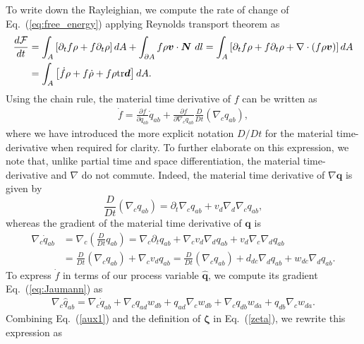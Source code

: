 \documentclass[12pt]{iopart}
\begin{document}
	To write down the Rayleighian, we compute the rate of change of Eq.~(\ref{eq:free_energy}) applying Reynolds transport theorem as
	\begin{eqnarray} 
		\frac{d{\mathcal{F}}}{dt} &= \int_A \left[\partial_tf  \rho + f \partial_t{\rho} \right] dA + \int_{\partial A} f\rho \bm{v} \cdot\bm{N} ~dl = \int_A \left[\partial_tf  \rho + f \partial_t{\rho}  + \nabla\cdot\left(f\rho \bm{v}\right) \right] dA  \nonumber\\
		&=\int_A \left[\dot{f}  \rho + f \dot{\rho}  + f\rho {\rm tr}\bm{d} \right] dA. \label{eq:change_of_free_energy}
	\end{eqnarray}
	Using the chain rule, the material time derivative of $f$ can be written as
	\begin{eqnarray} 
		\dot{f} =   \frac{\partial f}{\partial q_{ab}} \dot{q}_{ab}+ \frac{\partial f}{\partial \nabla_c q_{ab}} \frac{D}{Dt} \left(\nabla_c q_{ab}\right), \label{eq:dotf}  
	\end{eqnarray}
	where we have introduced the more explicit notation $D/Dt$ for the material time-derivative when required for clarity. To further elaborate on this expression, we note that, unlike partial time and space differentiation, the material time-derivative and $\nabla$ do not commute. Indeed, the material time derivative of $\nabla \bm{q}$ is given by
	\begin{equation}
		\frac{D}{Dt} \left(\nabla_c q_{ab}\right) = \partial_t  \nabla_c q_{ab} + v_d  \nabla_d \nabla_c q_{ab},
	\end{equation}
	whereas the gradient of the material time derivative of $\bm{q}$ is
	\begin{eqnarray}
		\nabla_c \dot{q}_{ab} & = \nabla_c \left(\frac{D}{Dt} {q}_{ab}\right) = \nabla_c \partial_t   q_{ab} + \nabla_c v_d \nabla_d q_{ab} + v_d  \nabla_c \nabla_d  q_{ab} \nonumber \\ & = \frac{D}{Dt} \left(\nabla_c q_{ab}\right) + \nabla_c v_d q_{ab}  = \frac{D}{Dt} \left(\nabla_c q_{ab}\right) + d_{dc} \nabla_d q_{ab} + w_{dc} \nabla_d q_{ab}.\label{aux1}
	\end{eqnarray}
	To express $\dot{f}$ in terms of our process variable $\widehat{\bm{q}}$, we compute its gradient Eq.~(\ref{eq:Jaumann}) as
	\begin{eqnarray}
		\nabla_c \widehat{q}_{ab} =  \nabla_c \dot{q}_{ab}  + \nabla_c q_{ad} w_{db} + q_{ad}\nabla_c  w_{db}  + \nabla_c q_{db} w_{da} + q_{db} \nabla_c  w_{da}.
	\end{eqnarray}
	Combining Eq.~(\ref{aux1}) and the definition of $\bm{\zeta}$ in Eq.~(\ref{zeta}), we rewrite this expression as 
\end{document}

